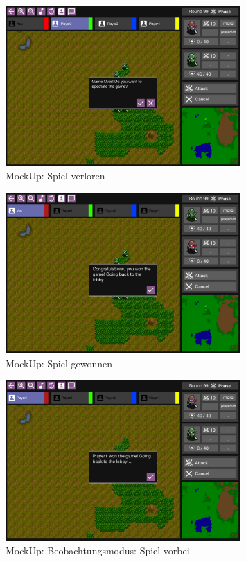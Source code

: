 \documentclass[12pt, titlepage]{scrartcl}
\begin{document}
			        \begin{figure}[H] 
    				    \centering
    				    \includegraphics[width=0.8\textwidth]{images/mockUps/GameOver.png}
    				    \caption{MockUp: Spiel verloren}
    				    \label{Game_Lost}
			        \end{figure}
			        \begin{figure}[H] 
    				    \centering
    				    \includegraphics[width=0.8\textwidth]{images/mockUps/GameWon.png}
    				    \caption{MockUp: Spiel gewonnen}
    				    \label{Game_Won}
			        \end{figure}
			        \begin{figure}[H] 
    				    \centering
    				    \includegraphics[width=0.8\textwidth]{images/mockUps/SpectatorEnd.png}
    				    \caption{MockUp: Beobachtungsmodus: Spiel vorbei}
    				    \label{Spectator_End}
			        \end{figure}
\end{document}
